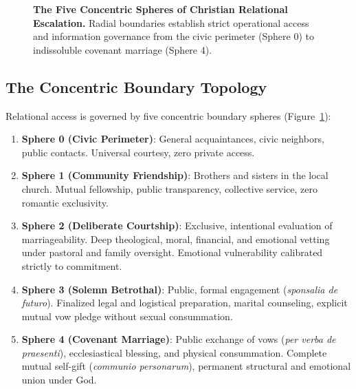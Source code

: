 \documentclass[11pt,twocolumn]{article}
\begin{document}
\begin{figure}[t]
\caption{\textbf{The Five Concentric Spheres of Christian Relational Escalation.} Radial boundaries establish strict operational access and information governance from the civic perimeter (Sphere 0) to indissoluble covenant marriage (Sphere 4).}
\label{fig:concentric}
\end{figure}

\subsection{The Concentric Boundary Topology}
Relational access is governed by five concentric boundary spheres (Figure~\ref{fig:concentric}):
\begin{enumerate}
    \item \textbf{Sphere 0 (Civic Perimeter)}: General acquaintances, civic neighbors, public contacts. Universal courtesy, zero private access.
    \item \textbf{Sphere 1 (Community Friendship)}: Brothers and sisters in the local church. Mutual fellowship, public transparency, collective service, zero romantic exclusivity.
    \item \textbf{Sphere 2 (Deliberate Courtship)}: Exclusive, intentional evaluation of marriageability. Deep theological, moral, financial, and emotional vetting under pastoral and family oversight. Emotional vulnerability calibrated strictly to commitment.
    \item \textbf{Sphere 3 (Solemn Betrothal)}: Public, formal engagement (\textit{sponsalia de futuro}). Finalized legal and logistical preparation, marital counseling, explicit mutual vow pledge without sexual consummation.
    \item \textbf{Sphere 4 (Covenant Marriage)}: Public exchange of vows (\textit{per verba de praesenti}), ecclesiastical blessing, and physical consummation. Complete mutual self-gift (\textit{communio personarum}), permanent structural and emotional union under God.
\end{enumerate}
\end{document}
